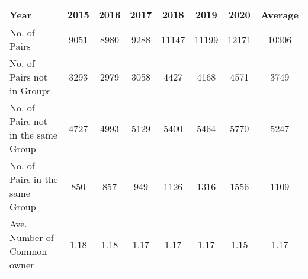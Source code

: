 \begin{tabular}{lccccccc}
\toprule
Year &  2015 &  2016 &  2017 &   2018 &   2019 &   2020 & Average \\
\midrule
No. of Pairs                       &  9051 &  8980 &  9288 &  11147 &  11199 &  12171 &   10306 \\
No. of Pairs not in Groups         &  3293 &  2979 &  3058 &   4427 &   4168 &   4571 &    3749 \\
No. of Pairs not in the same Group &  4727 &  4993 &  5129 &   5400 &   5464 &   5770 &    5247 \\
No. of Pairs in the same Group     &   850 &   857 &   949 &   1126 &   1316 &   1556 &    1109 \\
Ave. Number of Common owner        &  1.18 &  1.18 &  1.17 &   1.17 &   1.17 &   1.15 &    1.17 \\
\bottomrule
\end{tabular}
